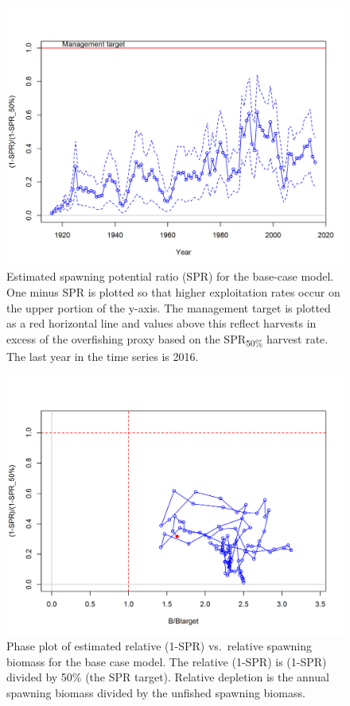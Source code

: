 \documentclass[12pt,]{article}
\begin{document}
\FloatBarrier

\begin{figure}[htbp]
\centering
\includegraphics{r4ss/plots_mod1/SPR3_ratiointerval.png}
\caption{Estimated spawning potential ratio (SPR) for the base-case
model. One minus SPR is plotted so that higher exploitation rates occur
on the upper portion of the y-axis. The management target is plotted as
a red horizontal line and values above this reflect harvests in excess
of the overfishing proxy based on the SPR\textsubscript{50\%} harvest
rate. The last year in the time series is 2016. \label{fig:SPR_all}}
\end{figure}

\begin{figure}[htbp]
\centering
\includegraphics{r4ss/plots_mod1/SPR4_phase.png}
\caption{Phase plot of estimated relative (1-SPR) vs.~relative spawning
biomass for the base case model. The relative (1-SPR) is (1-SPR) divided
by 50\% (the SPR target). Relative depletion is the annual spawning
biomass divided by the unfished spawning biomass. \label{fig:Phase_all}}
\end{figure}
\end{document}
